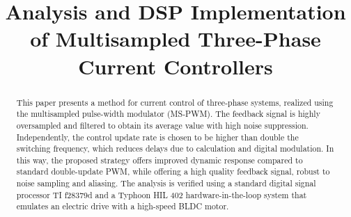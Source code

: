 \documentclass[conference]{IEEEtran}
\begin{document}
\title{Analysis and DSP Implementation of Multisampled Three-Phase Current Controllers}

\author{
\and
{}
\and
{}
\and
{}
\and
{}
}


\maketitle

\begin{abstract}
This paper presents a method for current control of three-phase systems, realized using the multisampled pulse-width modulator (MS-PWM). The feedback signal is highly oversampled and filtered to obtain its average value with high noise suppression. Independently, the control update rate is chosen to be higher than double the switching frequency, which reduces delays due to calculation and digital modulation. In this way, the proposed strategy offers improved dynamic response compared to standard double-update PWM, while offering a high quality feedback signal, robust to noise sampling and aliasing.
The analysis is verified using a standard digital signal processor TI f28379d and a Typhoon HIL 402 hardware-in-the-loop system that emulates an electric drive with a high-speed BLDC motor.
\end{abstract}
\end{document}

